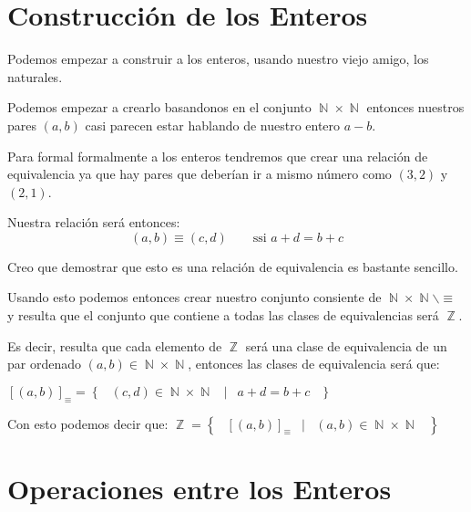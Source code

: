 \documentclass[12pt, fleqn]{report}                             %
\DeclareMathOperator \Space {\quad}                             %
\DeclareMathOperator \MiniSpace {\;}                            %
\newcommand \Such {\MiniSpace|\MiniSpace}                       %
\newcommand{\Set}[1]{\left\{ \MiniSpace #1 \MiniSpace \right\}} %
\DeclareMathOperator \Naturals  {\mathbb{N}}                     %
\DeclareMathOperator \Integers  {\mathbb{Z}}                     %
\begin{document}
    \section{Construcción de los Enteros}

        Podemos empezar a construir a los enteros, usando nuestro viejo amigo, los 
        naturales.

        Podemos empezar a crearlo basandonos en el conjunto $\Naturals \times \Naturals$
        entonces nuestros pares $(a, b)$ casi parecen estar hablando de nuestro entero 
        $a-b$.

        Para formal formalmente a los enteros tendremos que crear una relación de equivalencia
        ya que hay pares que deberían ir a mismo número como $(3,2)$ y $(2,1)$.

        Nuestra relación será entonces:
        \begin{equation}
            (a,b) \equiv (c,d) \Space \text{ ssi } a + d = b + c
        \end{equation}

        Creo que demostrar que esto es una relación de equivalencia es bastante sencillo.

        Usando esto podemos entonces crear nuestro conjunto consiente de
        $\Naturals \times \Naturals \backslash \equiv$ y resulta que el conjunto que contiene
        a todas las clases de equivalencias será $\Integers$.

        Es decir, resulta que cada elemento de $\Integers$ será una clase de equivalencia
        de un par ordenado $(a,b) \in \Naturals \times \Naturals$, entonces
        las clases de equivalencia será que:

        $[(a,b)]_{\equiv} = \Set{(c,d) \in \Naturals \times \Naturals \Such a+d=b+c}$

        Con esto podemos decir que:
        $\Integers = \Set{ [(a,b)]_{\equiv} \Such (a,b) \in \Naturals \times \Naturals}$


        \clearpage
        \section{Operaciones entre los Enteros}
\end{document}
